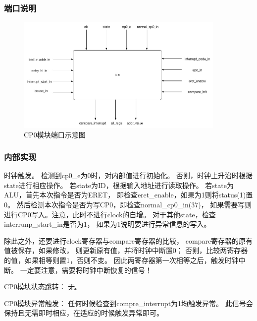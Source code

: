         \subsubsection{端口说明}
            
            \begin{figure}[!hbp]
                \centering
                \caption{CP0模块端口示意图}
                \includegraphics[width=0.9\textwidth]{chart/cp0.jpg}
            \end{figure}
        \subsubsection{内部实现}
            时钟触发。%
            检测到cp0\_e为0时，对内部值进行初始化。%
            否则，时钟上升沿时根据state进行相应操作。%
            若state为ID，根据输入地址进行读取操作。%
            若state为ALU，首先本次指令是否为ERET，%
            即检查eret\_enable，如果为1则将status(1)置0。%
            然后检测本次指令是否为写CP0，即检查normal\_cp0\_in(37)，%
            如果需要写则进行CP0写入。注意，此时不进行clock的自增。%
            对于其他state，检查interrunp\_start\_in是否为1，%
            如果为1说明要进行异常信息的写入。%
            
            除此之外，还要进行clock寄存器与compare寄存器的比较，%
            compare寄存器的原有值被保存，如果修改，%
            则更新原有值，并将时钟中断置0；%
            否则，比较两寄存器的值，如果相等则置1，否则不变。%
            因此两寄存器第一次相等之后，触发时钟中断。%
            一定要注意，需要将时钟中断恢复的信号！

            CP0模块状态跳转：%
            无。%

            CP0模块异常触发：%
            任何时候检查到compre\_interrupt为1均触发异常。%
            此信号会保持且无需即时相应，在适应的时候触发异常即可。
    
